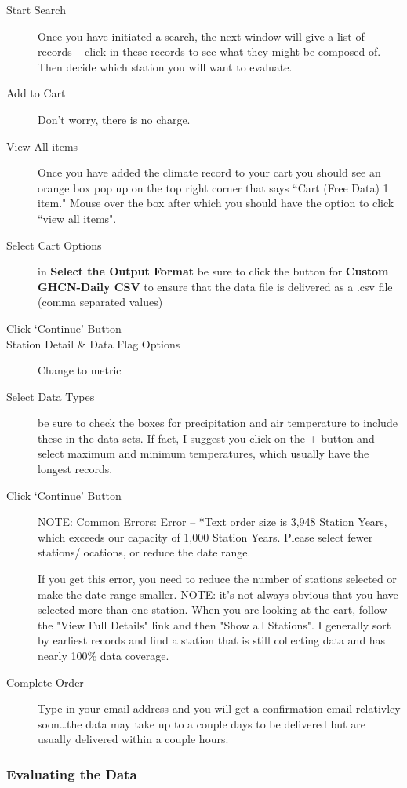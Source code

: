 \documentclass{article}\usepackage[]{graphicx}\usepackage[]{xcolor}
\begin{document}
\begin{description}
  \item[Start Search] Once you have initiated a search, the next window will give a list of records -- click in these records to see what they might be composed of. Then decide which station you will want to evaluate.
  \item[Add to Cart] Don't worry, there is no charge. 
  \item[View All items] Once you have added the climate record to your cart you should see an orange box pop up on the top right corner that says ``Cart (Free Data) 1 item." Mouse over the box after which you should have the option to click ``view all items".
  \item[Select Cart Options] in \textbf{Select the Output Format} be sure to click the button for \textbf{Custom GHCN-Daily CSV} to ensure that the data file is delivered as a .csv file (comma separated values)
  \item[Click `Continue' Button]
  \item[Station Detail \& Data Flag Options] Change to metric
  \item[Select Data Types] be sure to check the boxes for precipitation and air temperature to include these in the data sets. If fact, I suggest you click on the + button and select maximum and minimum temperatures, which usually have the longest records.
  \item[Click `Continue' Button] NOTE: Common Errors:
Error -- *Text order size is 3,948 Station Years, which exceeds our capacity of 1,000 Station Years. Please select fewer stations/locations, or reduce the date range.

If you get this error, you need to reduce the number of stations selected or make the date range smaller. NOTE: it's not always obvious that you have selected more than one station. When you are looking at the cart, follow the "View Full Details" link and then "Show all Stations". I generally sort by earliest records and find a station that is still collecting data and has nearly 100\% data coverage. 
  
  \item[Complete Order] Type in your email address and you will get a confirmation email relativley soon\ldots the data may take up to a couple days to be delivered but are usually delivered within a couple hours.
\end{description}


\subsubsection{Evaluating the Data}
\end{document}
